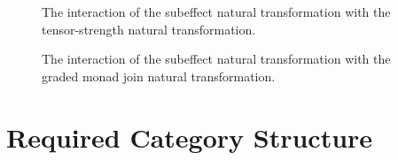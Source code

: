\documentclass{Report}
\begin{document}
\begin{figure}[H]
\centering
\begin{minipage}{0.45\textwidth}
    \begin{framed}
    \end{framed}
    \caption{The interaction of the subeffect natural transformation with the tensor-strength natural transformation.}
    \label{SubeffectTensorStrength}
\end{minipage}  
\quad
\begin{minipage}{0.45\textwidth}
    \begin{framed}
    \end{framed}

\caption{The interaction of the subeffect natural transformation with the graded monad join natural transformation.}
\label{SubeffectBind}
\end{minipage}  
\end{figure}


\section{Required Category Structure}\label{PECRequirements}
\end{document}
